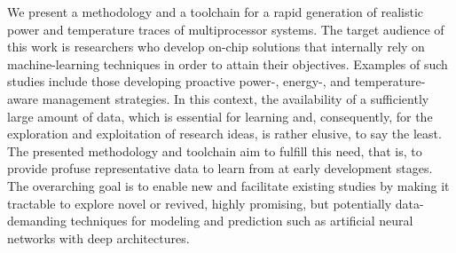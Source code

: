 We present a methodology and a toolchain for a rapid generation of realistic
power and temperature traces of multiprocessor systems. The target audience of
this work is researchers who develop on-chip solutions that internally rely on
machine-learning techniques in order to attain their objectives. Examples of
such studies include those developing proactive power-, energy-, and
temperature-aware management strategies. In this context, the availability of a
sufficiently large amount of data, which is essential for learning and,
consequently, for the exploration and exploitation of research ideas, is rather
elusive, to say the least. The presented methodology and toolchain aim to
fulfill this need, that is, to provide profuse representative data to learn from
at early development stages. The overarching goal is to enable new and
facilitate existing studies by making it tractable to explore novel or revived,
highly promising, but potentially data-demanding techniques for modeling and
prediction such as artificial neural networks with deep architectures.
